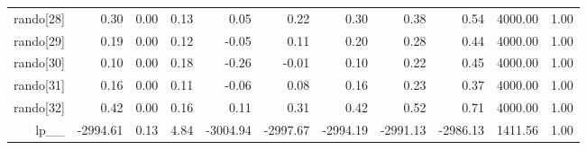 \begin{table}[ht]
\begin{tabular}{rrrrrrrrrrr}
  rando[28] & 0.30 & 0.00 & 0.13 & 0.05 & 0.22 & 0.30 & 0.38 & 0.54 & 4000.00 & 1.00 \\ 
  rando[29] & 0.19 & 0.00 & 0.12 & -0.05 & 0.11 & 0.20 & 0.28 & 0.44 & 4000.00 & 1.00 \\ 
  rando[30] & 0.10 & 0.00 & 0.18 & -0.26 & -0.01 & 0.10 & 0.22 & 0.45 & 4000.00 & 1.00 \\ 
  rando[31] & 0.16 & 0.00 & 0.11 & -0.06 & 0.08 & 0.16 & 0.23 & 0.37 & 4000.00 & 1.00 \\ 
  rando[32] & 0.42 & 0.00 & 0.16 & 0.11 & 0.31 & 0.42 & 0.52 & 0.71 & 4000.00 & 1.00 \\ 
  lp\_\_ & -2994.61 & 0.13 & 4.84 & -3004.94 & -2997.67 & -2994.19 & -2991.13 & -2986.13 & 1411.56 & 1.00 \\ 
   \hline
\end{tabular}
\label{weifit_tab}
\end{table}

